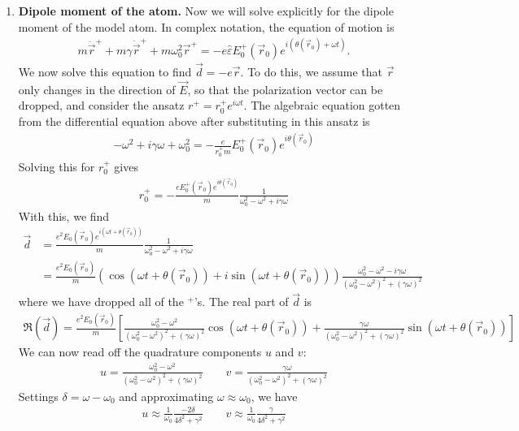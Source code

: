 \documentclass{article}
\theoremstyle{definition}
\newcommand{\f}[2]{\frac{#1}{#2}}
\newcommand{\lb}{\left[}
\newcommand{\rb}{\right]}
\begin{document}
\begin{enumerate}[label=\alph*)]
	\item \textbf{Dipole moment of the atom.} Now we will solve explicitly for the dipole moment of the model atom. In complex notation, the equation of motion is
	\begin{align*}
	m \ddot{\vec{r}}^+ + m\gamma \dot{\vec{r}}^+ + m \omega_0^2 \vec{r}^+ = -e \hat{\varepsilon} E_0^+ (\vec{r}_0) e^{i( \theta(\vec{r}_0)  + \omega t )}.
	\end{align*}
	We now solve this equation to find $\vec{d} = -e \vec{r}$. To do this, we assume that $\vec{r}$ only changes in the direction of $\vec{E}$, so that the polarization vector can be dropped, and consider the ansatz $r^+ = r_0^+ e^{i \omega t}$. The algebraic equation gotten from the differential equation above after substituting in this ansatz is 
	\begin{align*}
	- \omega^2+ i\gamma   \omega + \omega_0^2   = -\f{e}{r_0^+ m} E_0^+(\vec{r}_0) e^{i\theta(\vec{r}_0)}
	\end{align*}
	Solving this for $r_0^+$ gives
	\begin{align*}
	r_0^+ = -\f{e E_0^+(\vec{r}_0) e^{i\theta(\vec{r}_0)}}{m}  \f{1}{ \omega_0^2 - \omega^2 + i\gamma \omega  }
	\end{align*}
	With this, we find 
	\begin{align*}
	\vec{d} &= \f{e^2 E_0(\vec{r}_0) e^{i(\omega t + \theta(\vec{r}_0))}}{m} \f{1}{\omega_0^2 - \omega^2 + i \gamma \omega} \\
	&= \f{e^2 E_0(\vec{r}_0)}{m} (\cos(\omega t + \theta(\vec{r}_0) )+ i \sin(\omega t + \theta(\vec{r}_0))) \f{\omega_0^2 - \omega^2 - i\gamma \omega  }{(\omega_0^2 - \omega^2)^2 + (\gamma \omega)^2}
	\end{align*}
	where we have dropped all of the $^+$'s. The real part of $\vec{d}$ is 
	\begin{align*}
	\boxed{\Re(\vec{d}) = \f{e^2 E_0(\vec{r}_0)}{m} \lb  \f{\omega_0^2 - \omega^2}{(\omega_0^2 - \omega^2)^2 + (\gamma \omega)^2}  \cos(\omega t + \theta(\vec{r}_0)) + \f{\gamma \omega}{ (\omega_0^2 - \omega^2)^2 + (\gamma \omega)^2 } \sin(\omega t + \theta(\vec{r}_0)) \rb}
	\end{align*}
	We can now read off the quadrature components $u$ and $v$:
	\begin{align*}
	u =  \f{\omega_0^2 - \omega^2}{(\omega_0^2 - \omega^2)^2 + (\gamma \omega)^2}  \quad\quad 
	v = \f{\gamma \omega}{ (\omega_0^2 - \omega^2)^2 + (\gamma \omega)^2 } 
	\end{align*}
	Settings $\delta = \omega - \omega_0$ and approximating $\omega \approx \omega_0$, we have
	\begin{align*}
	u \approx \f{1}{\omega_0} \f{-2 \delta }{4 \delta^2 + \gamma^2} \quad\quad 
	v \approx \f{1}{\omega_0}\f{\gamma}{4\delta^2 + \gamma^2}
	\end{align*}
	

\end{enumerate}
\end{document}
